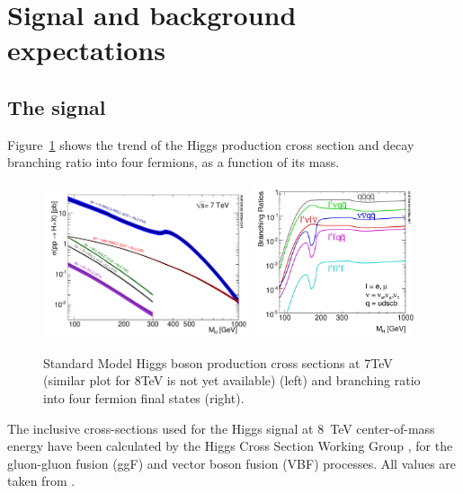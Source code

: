 \section{Signal and background expectations}
\label{sec:MCexpectations}


\subsection {The signal}


Figure~\ref{fig:higgsXSBR} shows the trend of the Higgs production cross section and decay branching ratio into four fermions, 
as a function of its mass.
%
\begin{figure}[htb] 
  {\centering
    \includegraphics[width=0.54\textwidth]{plots/limitplot/Higgs_XS_7TeV.pdf}
    \includegraphics[width=0.42\textwidth]{plots/limitplot/Higgs_BR_4fermion_1.pdf}
    \caption{Standard Model Higgs boson production cross sections at 7TeV (similar plot for 8TeV is not yet available) (left) and branching ratio into four fermion final states (right).}
    \label{fig:higgsXSBR}}
\end{figure}
%
The inclusive cross-sections used for the Higgs signal at 8~TeV
center-of-mass energy have been calculated by the Higgs Cross Section
Working Group
\cite{LHCHiggsCrossSectionWorkingGroup:2011ti},\cite{Dittmaier:2012vm}
for the gluon-gluon fusion (ggF) and vector boson fusion (VBF)
processes.  All values are taken from \cite{cite:higgsxsecbr}.


